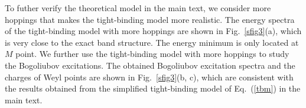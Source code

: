 \documentclass[aps,pra,floatfix,twocolumn,superscriptaddress]{revtex4-1}
\begin{document}
To futher verify the theoretical model in the main text, we consider more hoppings that makes the tight-binding model more realistic. The energy spectra of the tight-binding model with more hoppings are shown in Fig.~\ref{sfig3}(a), which is very close to the exact band structure. The energy minimum is only located at $M$ point. We further use the tight-binding model with more hoppings to study the Bogoliubov excitations. The obtained Bogoliubov excitation spectra and the charges of Weyl points are shown in Fig.~\ref{sfig3}(b, c), which are consistent with the results obtained from the simplified tight-binding model of Eq.~(\ref{tbm}) in the main text.


\end{document}
